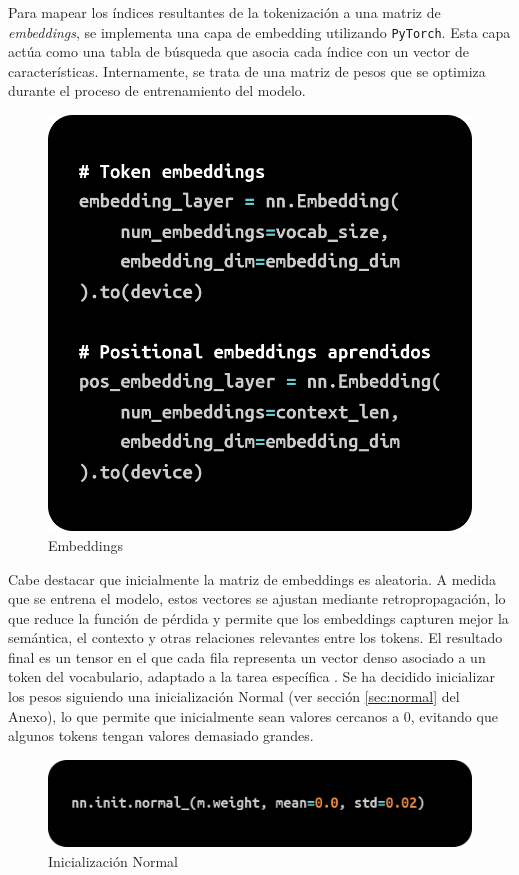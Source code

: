 \documentclass[11pt]{book}
\begin{document}
Para mapear los índices resultantes de la tokenización a una matriz de \textit{embeddings}, se implementa una capa de embedding utilizando \texttt{PyTorch}. Esta capa actúa como una tabla de búsqueda que asocia cada índice con un vector de características. Internamente, se trata de una matriz de pesos que se optimiza durante el proceso de entrenamiento del modelo.

\begin{figure}[h]
    \centering
    \includegraphics[width=0.5\linewidth]{img/embeddings1.png}
    \caption{Embeddings}
    \label{fig:placeholder17}
\end{figure}

Cabe destacar que inicialmente la matriz de embeddings es aleatoria. A medida que se entrena el modelo, estos vectores se ajustan mediante retropropagación, lo que reduce la función de pérdida y permite que los embeddings capturen mejor la semántica, el contexto y otras relaciones relevantes entre los tokens. El resultado final es un tensor en el que cada fila representa un vector denso asociado a un token del vocabulario, adaptado a la tarea específica \parencite{bao2022embedding}. Se ha decidido inicializar los pesos siguiendo una inicialización Normal (ver sección \ref{sec:normal} del Anexo), lo que permite que inicialmente sean valores cercanos a 0, evitando que algunos tokens tengan valores demasiado grandes. 

\begin{figure}[h]
    \centering
    \includegraphics[width=0.5\linewidth]{img/normal_init.png}
    \caption{Inicialización Normal}
    \label{fig:placeholder18}
\end{figure}

\end{document}
